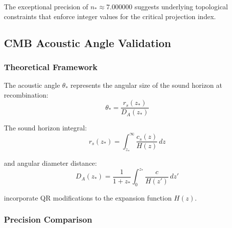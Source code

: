 
The exceptional precision of $n_\ast \approx 7.000000$ suggests underlying topological constraints that enforce integer values for the critical projection index.

\subsection{CMB Acoustic Angle Validation}
\label{subsec:cmb-acoustic-validation}

\subsubsection{Theoretical Framework}
\label{subsubsec:cmb-theory}

The acoustic angle $\theta_*$ represents the angular size of the sound horizon at recombination:
\begin{equation}
\theta_* = \frac{r_s(z_*)}{D_A(z_*)}
\end{equation}

The sound horizon integral:
\begin{equation}
r_s(z_*) = \int_{z_*}^{\infty} \frac{c_s(z)}{H(z)} \, dz
\end{equation}

and angular diameter distance:
\begin{equation}
D_A(z_*) = \frac{1}{1+z_*} \int_0^{z_*} \frac{c}{H(z')} \, dz'
\end{equation}

incorporate QR modifications to the expansion function $H(z)$.

\subsubsection{Precision Comparison}
\label{subsubsec:cmb-precision}


